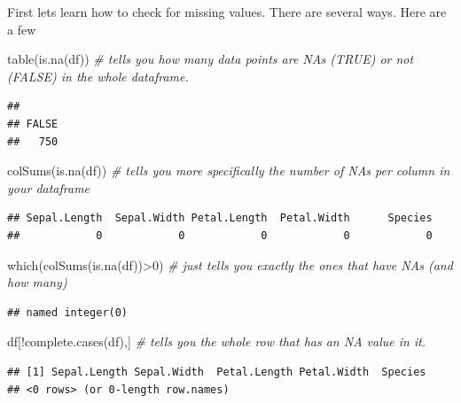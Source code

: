 \documentclass[
]{book}
\newenvironment{Shaded}{\begin{snugshade}}{\end{snugshade}}
\newcommand{\CommentTok}[1]{\textcolor[rgb]{0.56,0.35,0.01}{\textit{#1}}}
\newcommand{\DecValTok}[1]{\textcolor[rgb]{0.00,0.00,0.81}{#1}}
\newcommand{\FunctionTok}[1]{\textcolor[rgb]{0.00,0.00,0.00}{#1}}
\newcommand{\NormalTok}[1]{#1}
\newcommand{\SpecialCharTok}[1]{\textcolor[rgb]{0.00,0.00,0.00}{#1}}
\begin{document}
First lets learn how to check for missing values.
There are several ways.
Here are a few

\begin{Shaded}
\begin{Highlighting}[]
\FunctionTok{table}\NormalTok{(}\FunctionTok{is.na}\NormalTok{(df))  }\CommentTok{\# tells you how many data points are NAs (TRUE) or not (FALSE) in the whole dataframe.}
\end{Highlighting}
\end{Shaded}

\begin{verbatim}
## 
## FALSE 
##   750
\end{verbatim}

\begin{Shaded}
\begin{Highlighting}[]
\FunctionTok{colSums}\NormalTok{(}\FunctionTok{is.na}\NormalTok{(df))  }\CommentTok{\# tells you more specifically the number of NAs per column in your dataframe}
\end{Highlighting}
\end{Shaded}

\begin{verbatim}
## Sepal.Length  Sepal.Width Petal.Length  Petal.Width      Species 
##            0            0            0            0            0
\end{verbatim}

\begin{Shaded}
\begin{Highlighting}[]
\FunctionTok{which}\NormalTok{(}\FunctionTok{colSums}\NormalTok{(}\FunctionTok{is.na}\NormalTok{(df))}\SpecialCharTok{\textgreater{}}\DecValTok{0}\NormalTok{)  }\CommentTok{\# just tells you exactly the ones that have NAs (and how many)}
\end{Highlighting}
\end{Shaded}

\begin{verbatim}
## named integer(0)
\end{verbatim}

\begin{Shaded}
\begin{Highlighting}[]
\NormalTok{df[}\SpecialCharTok{!}\FunctionTok{complete.cases}\NormalTok{(df),]  }\CommentTok{\# tells you the whole row that has an NA value in it.}
\end{Highlighting}
\end{Shaded}

\begin{verbatim}
## [1] Sepal.Length Sepal.Width  Petal.Length Petal.Width  Species     
## <0 rows> (or 0-length row.names)
\end{verbatim}
\end{document}
